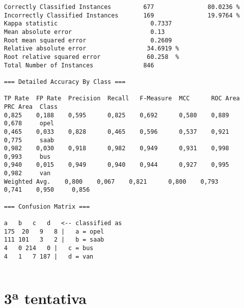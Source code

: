 \documentclass[
	article,			%
	11pt,				%
	oneside,			%
	a4paper,			%
	english,			%
	brazil,				%
	sumario=tradicional
	]{abntex2}
\begin{document}
\begin{lstlisting}
Correctly Classified Instances         677               80.0236 %
Incorrectly Classified Instances       169               19.9764 %
Kappa statistic                          0.7337
Mean absolute error                      0.13  
Root mean squared error                  0.2609
Relative absolute error                 34.6919 %
Root relative squared error             60.258  %
Total Number of Instances              846     

=== Detailed Accuracy By Class ===

TP Rate  FP Rate  Precision  Recall   F-Measure  MCC      ROC Area  PRC Area  Class
0,825    0,188    0,595      0,825    0,692      0,580    0,889     0,678     opel
0,465    0,033    0,828      0,465    0,596      0,537    0,921     0,775     saab
0,982    0,030    0,918      0,982    0,949      0,931    0,998     0,993     bus
0,940    0,015    0,949      0,940    0,944      0,927    0,995     0,982     van
Weighted Avg.    0,800    0,067    0,821      0,800    0,793      0,741    0,950     0,856     

=== Confusion Matrix ===

a   b   c   d   <-- classified as
175  20   9   8 |   a = opel
111 101   3   2 |   b = saab
4   0 214   0 |   c = bus
4   1   7 187 |   d = van


\end{lstlisting}

\section{3ª tentativa}
\end{document}
